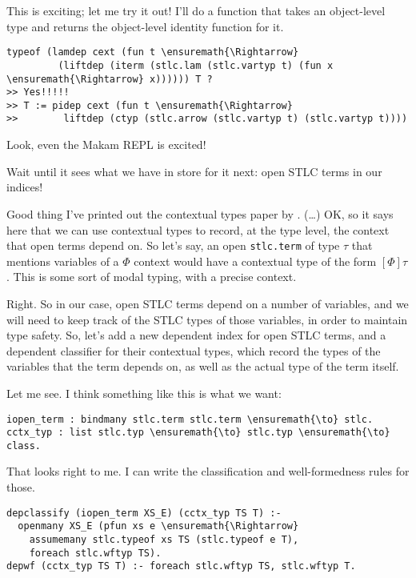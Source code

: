 \heroADVISOR{} This is exciting; let me try it out! I'll do a function that
takes an object-level type and returns the object-level identity
function for it.

\begin{verbatim}
typeof (lamdep cext (fun t \ensuremath{\Rightarrow}
         (liftdep (iterm (stlc.lam (stlc.vartyp t) (fun x \ensuremath{\Rightarrow} x)))))) T ?
>> Yes!!!!!
>> T := pidep cext (fun t \ensuremath{\Rightarrow}
>>        liftdep (ctyp (stlc.arrow (stlc.vartyp t) (stlc.vartyp t))))
\end{verbatim}

\heroSTUDENT{} Look, even the Makam REPL is excited!

\heroADVISOR{} Wait until it sees what we have in store for it next: open STLC
terms in our indices!

\heroSTUDENT{} Good thing I've printed out the contextual types paper by
\citet{nanevski2008contextual}. (\ldots{}) OK, so it says here that we
can use contextual types to record, at the type level, the context that
open terms depend on. So let's say, an open \texttt{stlc.term} of type
\(\tau\) that mentions variables of a \(\Phi\) context would have a
contextual type of the form \([\Phi] \tau\). This is some sort of modal
typing, with a precise context.

\heroADVISOR{} Right. So in our case, open STLC terms depend on a number of
variables, and we will need to keep track of the STLC types of those
variables, in order to maintain type safety. So, let's add a new
dependent index for open STLC terms, and a dependent classifier for
their contextual types, which record the types of the variables that the
term depends on, as well as the actual type of the term itself.

\heroSTUDENT{} Let me see. I think something like this is what we want:

\begin{verbatim}
iopen_term : bindmany stlc.term stlc.term \ensuremath{\to} stlc.
cctx_typ : list stlc.typ \ensuremath{\to} stlc.typ \ensuremath{\to} class.
\end{verbatim}

\heroADVISOR{} That looks right to me. I can write the classification and
well-formedness rules for those.

\begin{verbatim}
depclassify (iopen_term XS_E) (cctx_typ TS T) :-
  openmany XS_E (pfun xs e \ensuremath{\Rightarrow}
    assumemany stlc.typeof xs TS (stlc.typeof e T),
    foreach stlc.wftyp TS).
depwf (cctx_typ TS T) :- foreach stlc.wftyp TS, stlc.wftyp T.
\end{verbatim}

